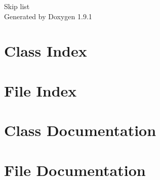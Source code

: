 \let\mypdfximage\pdfximage\def\pdfximage{\immediate\mypdfximage}\documentclass[twoside]{book}
\newcommand{\+}{\discretionary{\mbox{\scriptsize$\hookleftarrow$}}{}{}}
\newcommand{\clearemptydoublepage}{%
  \newpage{\pagestyle{empty}\cleardoublepage}%
}
\begin{document}
\raggedbottom

\hypersetup{pageanchor=false,
             bookmarksnumbered=true,
             pdfencoding=unicode
            }
\begin{titlepage}
\vspace*{7cm}
\begin{center}%
{\Large Skip list }\\
\vspace*{1cm}
{\large Generated by Doxygen 1.9.1}\\
\end{center}
\end{titlepage}
\clearemptydoublepage
{}
\tableofcontents
\clearemptydoublepage
{}
\hypersetup{pageanchor=true}

\chapter{Class Index}

\chapter{File Index}

\chapter{Class Documentation}



\chapter{File Documentation}



\backmatter
\newpage
{}
\clearemptydoublepage
{}
\printindex
\end{document}
